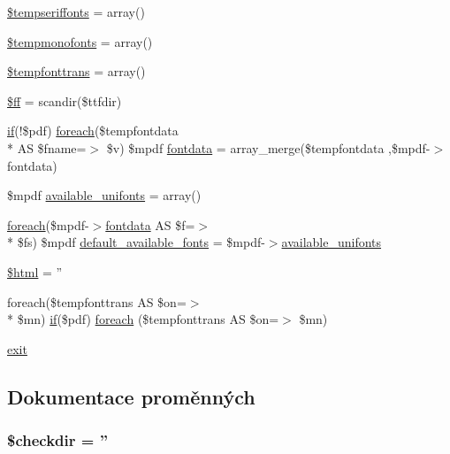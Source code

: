 \begin{DoxyCompactItemize}
\item 
\hyperlink{font__names_8php_ab74dd355fb2c8023006dd96b28490b57}{\$tempseriffonts} = array()
\item 
\hyperlink{font__names_8php_afc42e5925d18d7f0564c12391e5ef71c}{\$tempmonofonts} = array()
\item 
\hyperlink{font__names_8php_aed2e1668920a2587b53972478bb38bfe}{\$tempfonttrans} = array()
\item 
\hyperlink{font__names_8php_a064fd64c462dd929cd17812cf14ec09e}{\$ff} = scandir(\$ttfdir)
\item 
\hyperlink{pdf__parser_8php_af8105e84b42a9ceda5357caeb6c4760b}{if}(!\$pdf) \hyperlink{font__names_8php_ac6e05d8eea8274a71f8f9c686e891421}{foreach}(\$tempfontdata \\*
A\-S \$fname=$>$ \$v) \$mpdf \hyperlink{font__names_8php_a6f52753c29baf5d9c89eee86926d9d04}{fontdata} = array\-\_\-merge(\$tempfontdata ,\$mpdf-\/$>$fontdata)
\item 
\$mpdf \hyperlink{font__names_8php_a049dd680083527692e7216f4666de169}{available\-\_\-unifonts} = array()
\item 
\hyperlink{font__names_8php_ac6e05d8eea8274a71f8f9c686e891421}{foreach}(\$mpdf-\/$>$\hyperlink{font__names_8php_a6f52753c29baf5d9c89eee86926d9d04}{fontdata} A\-S \$f=$>$\\*
 \$fs) \$mpdf \hyperlink{font__names_8php_ac88c4b786b90f81858dc8ceef22bb037}{default\-\_\-available\-\_\-fonts} = \$mpdf-\/$>$\hyperlink{font__names_8php_a049dd680083527692e7216f4666de169}{available\-\_\-unifonts}
\item 
\hyperlink{font__names_8php_a6f96e7fc92441776c9d1cd3386663b40}{\$html} = ''
\item 
foreach(\$tempfonttrans A\-S \$on=$>$\\*
 \$mn) \hyperlink{pdf__parser_8php_af8105e84b42a9ceda5357caeb6c4760b}{if}(\$pdf) \hyperlink{font__names_8php_ac6e05d8eea8274a71f8f9c686e891421}{foreach} (\$tempfonttrans A\-S \$on=$>$ \$mn)
\item 
\hyperlink{font__names_8php_a6733eb5f605d09eaede9845835d71c4e}{exit}
\end{DoxyCompactItemize}


\subsection{Dokumentace proměnných}
\hypertarget{font__names_8php_ad773ebf7841c6538baa63f9945d7c9ca}{
\subsubsection[{\$checkdir}]{\setlength{\rightskip}{0pt plus 5cm}\$checkdir = ''}}\label{font__names_8php_ad773ebf7841c6538baa63f9945d7c9ca}


